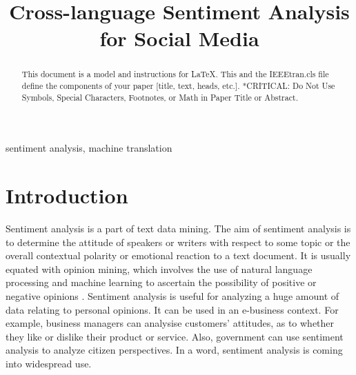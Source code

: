 \documentclass[conference]{IEEEtran}
\begin{document}
\title{\huge Cross-language Sentiment Analysis for Social Media}

\author{
\and
{}
\and
{}
\and
{}
}

\maketitle

\begin{abstract}
This document is a model and instructions for \LaTeX.
This and the IEEEtran.cls file define the components of your paper [title, text, heads, etc.]. *CRITICAL: Do Not Use Symbols, Special Characters, Footnotes, 
or Math in Paper Title or Abstract.
\end{abstract}

\begin{IEEEkeywords}
sentiment analysis, machine translation
\end{IEEEkeywords}

\section{Introduction}
Sentiment analysis is a part of text data mining. The aim of sentiment analysis
is to determine the attitude of speakers or writers with respect to some topic
or the overall contextual polarity or emotional reaction to a text document. It is usually equated with
opinion mining, which involves the use of natural language processing and
machine learning to ascertain the possibility of positive or negative opinions \cite{sentimentAnalysis}.
Sentiment analysis is useful for analyzing a huge amount of data relating to personal
opinions. It can be used in an e-business context. For example, business managers can analysise
customers' attitudes, as to whether they like or dislike their product or service.
Also, government can use sentiment analysis to analyze citizen perspectives.
In a word, sentiment analysis is coming into widespread use.
\end{document}
